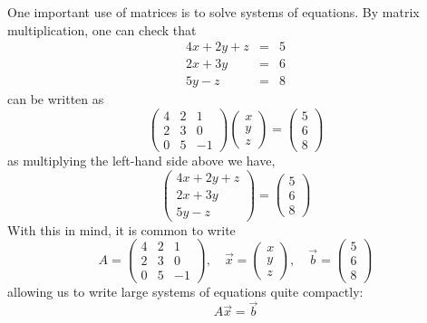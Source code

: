 \documentclass{ximera}
\begin{document}
One important use of matrices is to solve systems of equations. By matrix multiplication, one can check that
\begin{eqnarray*}
  4x+2y+z &=& 5\\
  2x+3y &=& 6\\
  5y -z &=& 8
\end{eqnarray*}
can be written as
\[
  \begin{pmatrix}
    4 & 2 & 1 \\
    2 & 3 & 0\\
    0 & 5 & -1
  \end{pmatrix}
  \begin{pmatrix}
    x \\
    y\\
    z
  \end{pmatrix}
  = \begin{pmatrix}
    5 \\
    6\\
    8
  \end{pmatrix}
\]
as multiplying the left-hand side above we have,
\[
  \begin{pmatrix}
    4x+2y+z\\
    2x+3y\\
    5y-z
  \end{pmatrix} = \begin{pmatrix}
    5\\
    6\\
    8
  \end{pmatrix}
\]
With this in mind, it is common to write
\[
  A = \begin{pmatrix}
    4 & 2 & 1 \\
    2 & 3 & 0\\
    0 & 5 & -1
  \end{pmatrix},\quad\vec x = \begin{pmatrix} x \\ y \\ z\end{pmatrix},
  \quad\vec b = \begin{pmatrix} 5 \\6\\8\end{pmatrix}
\]
allowing us to write large systems of equations quite compactly:
\[
  A\vec{x} = \vec{b}
\]
\end{document}
